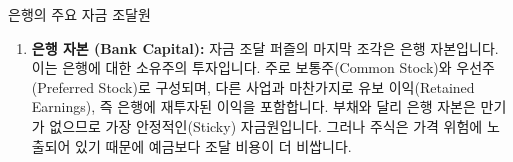 \documentclass[11pt,a4paper]{article}
\theoremstyle{definition}
\begin{document}
\begin{summarybox}{은행의 주요 자금 조달원}
\begin{enumerate}
\begin{itemize}
        \textbf{레포의 문제점:} 레포와 다른 단기 차입 자금은 투자자들이 걱정하기 시작하면 사라지는 경향이 있습니다. 2007년 공황은 레포 시장의 뱅크 런이었다고 유명하게 관찰되었습니다. 미상환 레포의 규모가 거의 하룻밤 사이에 붕괴되었고, 일부 은행들은 정말 중요한 자금원을 잃었습니다. 리먼 브라더스(Lehman Brothers)가 대표적인 예입니다.
    \end{itemize}

    \item \textbf{은행 자본 (Bank Capital):}
    자금 조달 퍼즐의 마지막 조각은 은행 자본입니다. 이는 은행에 대한 소유주의 투자입니다. 주로 보통주(Common Stock)와 우선주(Preferred Stock)로 구성되며, 다른 사업과 마찬가지로 유보 이익(Retained Earnings), 즉 은행에 재투자된 이익을 포함합니다. 부채와 달리 은행 자본은 만기가 없으므로 가장 안정적인(Sticky) 자금원입니다. 그러나 주식은 가격 위험에 노출되어 있기 때문에 예금보다 조달 비용이 더 비쌉니다.
\end{enumerate}
\end{summarybox}
\end{document}
